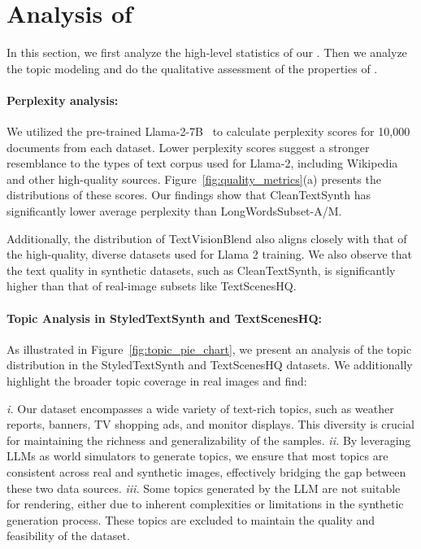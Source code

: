 \section{Analysis of \DatasetName}
In this section, we first analyze the high-level statistics of our \DatasetName.
Then we analyze the topic modeling and do the qualitative assessment of the properties of \DatasetName.






% 


\paragraph{Perplexity analysis:}
We utilized the pre-trained Llama-2-7B~\cite{llama2} to calculate perplexity scores for 10,000 documents from each dataset.
Lower perplexity scores suggest a stronger resemblance to the types of text corpus used for Llama-2, including Wikipedia and other high-quality sources.
Figure~\ref{fig:quality_metrics}(a) presents the distributions of these scores.
Our findings show that CleanTextSynth has significantly lower average perplexity than LongWordsSubset-A/M.

Additionally, the distribution of TextVisionBlend also aligns closely with that of the high-quality, diverse datasets used for Llama 2 training.
We also observe that the text quality in synthetic datasets, such as CleanTextSynth, is significantly higher than that of real-image subsets like TextScenesHQ.








\paragraph{Topic Analysis in StyledTextSynth and TextScenesHQ:}
As illustrated in Figure~\ref{fig:topic_pie_chart}, we present an analysis of the topic distribution in the StyledTextSynth and TextScenesHQ datasets.
We additionally highlight the broader topic coverage in real images and find:

\emph{i.} Our dataset encompasses a wide variety of text-rich topics, such as weather reports, banners, TV shopping ads, and monitor displays. This diversity is crucial for maintaining the richness and generalizability of the samples.
\emph{ii.} By leveraging LLMs as world simulators to generate topics, we ensure that most topics are consistent across real and synthetic images, effectively bridging the gap between these two data sources.
\emph{iii.} Some topics generated by the LLM are not suitable for rendering, either due to inherent complexities or limitations in the synthetic generation process. 
These topics are excluded to maintain the quality and feasibility of the dataset.



